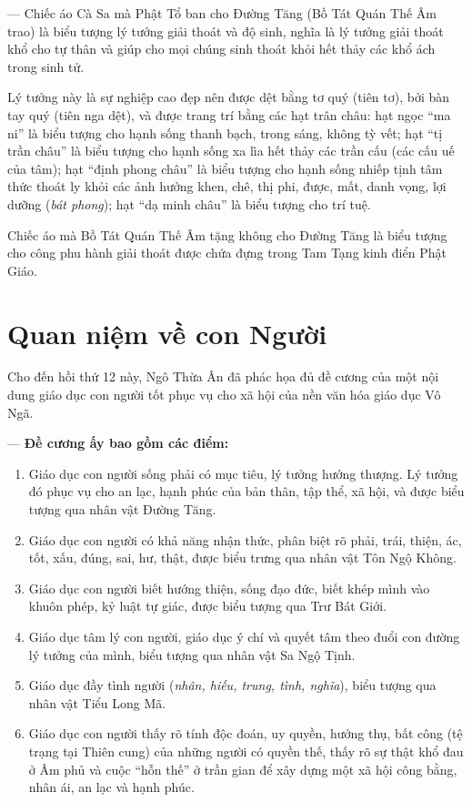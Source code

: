 --- Chiếc áo Cà Sa mà Phật Tổ ban cho Đường Tăng (Bồ Tát Quán Thế Âm trao) là biểu tượng lý tưởng giải thoát và độ sinh, nghĩa là lý tưởng giải thoát khổ cho tự thân và giúp cho mọi chúng sinh thoát khỏi hết thảy các khổ ách trong sinh tử.

Lý tưởng này là sự nghiệp cao đẹp nên được dệt bằng tơ quý (tiên tơ), bởi bàn tay quý (tiên nga dệt), và được trang trí bằng các hạt trân châu: hạt ngọc ``ma ni'' là biểu tượng cho hạnh sống thanh bạch, trong sáng, không tỳ vết; hạt ``tị trần châu'' là biểu tượng cho hạnh sống xa lìa hết thảy các trần cấu (các cấu uế của tâm); hạt ``định phong châu'' là biểu tượng cho hạnh sống nhiếp tịnh tâm thức thoát ly khỏi các ảnh hưởng khen, chê, thị phi, được, mất, danh vọng, lợi dưỡng (\emph{bát phong}); hạt ``dạ minh châu'' là biểu tượng cho trí tuệ.

Chiếc áo mà Bồ Tát Quán Thế Âm tặng không cho Đường Tăng là biểu tượng cho công phu hành giải thoát được chứa đựng trong Tam Tạng kinh điển Phật Giáo.


\section{Quan niệm về con Người} %
\label{sec:9_con_nguoi}

Cho đến hồi thứ 12 này, Ngô Thừa Ân đã phác họa đủ đề cương của một nội dung giáo dục con người tốt phục vụ cho xã hội của nền văn hóa giáo dục Vô Ngã.

--- {\bf Đề cương ấy bao gồm các điểm:}

\begin{enumerate}[label=\itshape\arabic*\upshape/]

    \item Giáo dục con người sống phải có mục tiêu, lý tưởng hướng thượng. Lý tưởng đó phục vụ cho an lạc, hạnh phúc của bản thân, tập thể, xã hội, và được biểu tượng qua nhân vật Đường Tăng.

    \item Giáo dục con người có khả năng nhận thức, phân biệt rõ phải, trái, thiện, ác, tốt, xấu, đúng, sai, hư, thật, được biểu trưng qua nhân vật Tôn Ngộ Không.

    \item Giáo dục con người biết hướng thiện, sống đạo đức, biết khép mình vào khuôn phép, kỷ luật tự giác, được biểu tượng qua Trư Bát Giới.

    \item Giáo dục tâm lý con người, giáo dục ý chí và quyết tâm theo đuổi con đường lý tưởng của mình, biểu tượng qua nhân vật Sa Ngộ Tịnh.

    \item Giáo dục đầy tình người (\emph{nhân, hiếu, trung, tình, nghĩa}), biểu tượng qua nhân vật Tiểu Long Mã.

    \item Giáo dục con người thấy rõ tính độc đoán, uy quyền, hưởng thụ, bất công (tệ trạng tại Thiên cung) của những người có quyền thế, thấy rõ sự thật khổ đau ở Âm phủ và cuộc ``hỗn thế'' ở trần gian để xây dựng một xã hội công bằng, nhân ái, an lạc và hạnh phúc.
\end{enumerate}

